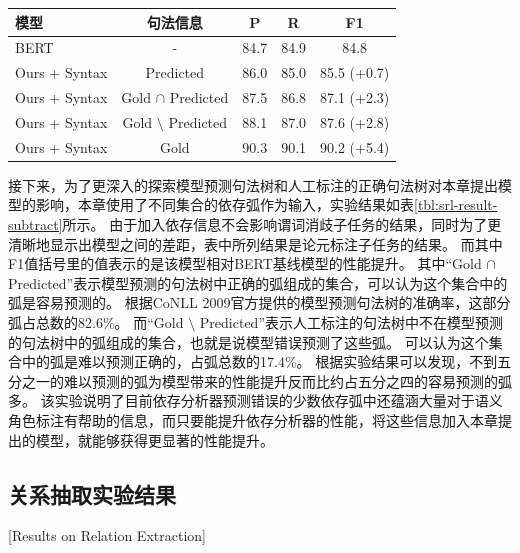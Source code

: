 \begin{table}[h]
    \vspace{0.5em}\centering\wuhao
    \begin{tabular}{lcccc}
        \toprule[1.5pt]
        模型 & 句法信息 & P & R & F1\\
        \midrule[1pt]
        BERT & - & 84.7 & 84.9 & 84.8 \\
        Ours + Syntax & Predicted & 86.0 & 85.0 & 85.5 (+0.7) \\
        Ours + Syntax & Gold $\cap$ Predicted & 87.5 & 86.8 & 87.1 (+2.3) \\
        Ours + Syntax & Gold $\setminus$ Predicted & 88.1 & 87.0 & 87.6 (+2.8) \\
        Ours + Syntax & Gold & 90.3 & 90.1 & 90.2 (+5.4)  \\
        \bottomrule[1.5pt]
    \end{tabular}
\end{table}

接下来，为了更深入的探索模型预测句法树和人工标注的正确句法树对本章提出模型的影响，本章使用了不同集合的依存弧作为输入，实验结果如表\ref{tbl:srl-result-subtract}所示。
由于加入依存信息不会影响谓词消歧子任务的结果，同时为了更清晰地显示出模型之间的差距，表中所列结果是论元标注子任务的结果。
而其中F1值括号里的值表示的是该模型相对BERT基线模型的性能提升。
其中“Gold $\cap$ Predicted”表示模型预测的句法树中正确的弧组成的集合，可以认为这个集合中的弧是容易预测的。
根据CoNLL 2009官方提供的模型预测句法树的准确率，这部分弧占总数的82.6\%。
而“Gold $\setminus$ Predicted”表示人工标注的句法树中不在模型预测的句法树中的弧组成的集合，也就是说模型错误预测了这些弧。
可以认为这个集合中的弧是难以预测正确的，占弧总数的17.4\%。
根据实验结果可以发现，不到五分之一的难以预测的弧为模型带来的性能提升反而比约占五分之四的容易预测的弧多。
该实验说明了目前依存分析器预测错误的少数依存弧中还蕴涵大量对于语义角色标注有帮助的信息，而只要能提升依存分析器的性能，将这些信息加入本章提出的模型，就能够获得更显著的性能提升。

\subsection{关系抽取实验结果}[Results on Relation Extraction]


